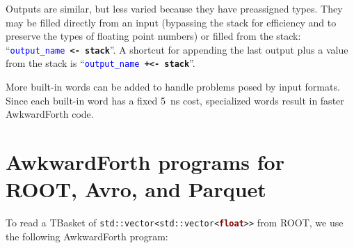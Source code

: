 \documentclass{webofc}
\begin{document}
Outputs are similar, but less varied because they have preassigned types. They may be filled directly from an input (bypassing the stack for efficiency and to preserve the types of floating point numbers) or filled from the stack: ``{\tt \textcolor{blue}{output\_name} \textcolor{OliveGreen}{\textbf{<-}} \textcolor{OliveGreen}{\textbf{stack}}}''. A shortcut for appending the last output plus a value from the stack is ``{\tt \textcolor{blue}{output\_name} \textcolor{OliveGreen}{\textbf{+<-}} \textcolor{OliveGreen}{\textbf{stack}}}''.

More built-in words can be added to handle problems posed by input formats. Since each built-in word has a fixed 5~ns cost, specialized words result in faster AwkwardForth code.

\vspace{-0.25 cm}
\section{AwkwardForth programs for ROOT, Avro, and Parquet}
\label{sec:programs}

To read a TBasket of {\tt std::vector<std::vector<\textcolor{Maroon}{\textbf{float}}>{}>} from ROOT, we use the following AwkwardForth program:
\end{document}
